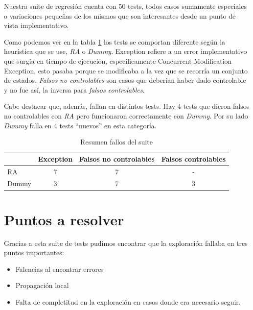Nuestra suite de regresión cuenta con 50 tests, todos casos sumamente especiales o variaciones pequeñas de los mismos que son interesantes desde un punto de vista implementativo. 

Como podemos ver en la tabla \ref{tab:resultadosTest} los tests se comportan diferente según la heurística que se use, \textit{RA} o \textit{Dummy}. Exception refiere a un error implementativo que surgía en tiempo de ejecución, específicamente Concurrent Modification Exception, esto pasaba porque se modificaba a la vez que se recorría un conjunto de estados. \textit{Falsos  no controlables} son casos que deberían haber dado controlable y no fue así, la inversa para \textit{falsos controlables}.

Cabe destacar que, además, fallan en distintos tests. Hay 4 tests que dieron falsos no controlables con \textit{RA} pero funcionaron correctamente con \textit{Dummy}. Por su lado \textit{Dummy} falla en 4 tests ``nuevos'' en esta categoría.

\begin{table}
    \centering
    \begin{tabular}{|l|c|c|c|}
    \hline
         & Exception & Falsos no controlables & Falsos controlables \\ \hline
        RA & 7 & 7 & - \\ \hline
        Dummy & 3 & 7 & 3 \\ 
    \hline
    \end{tabular}
    \caption{Resumen fallos del suite}
    \label{tab:resultadosTest}
\end{table}

% 
    


\section{Puntos a resolver}
Gracias a esta suite de tests pudimos encontrar que la exploración fallaba en tres puntos importantes:
\begin{itemize}
 \item Falencias al encontrar errores
 \item Propagación local
 \item Falta de completitud en la exploración en casos donde era necesario seguir.
\end{itemize}

